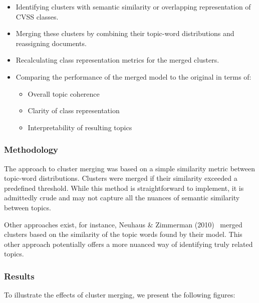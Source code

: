 \documentclass[12pt]{article}
\begin{document}
\begin{itemize}

	\item Identifying clusters with semantic similarity or overlapping representation of CVSS classes.

	\item Merging these clusters by combining their topic-word distributions and reassigning documents.

	\item Recalculating class representation metrics for the merged clusters.

	\item Comparing the performance of the merged model to the original in terms of:

	      \begin{itemize}

		      \item Overall topic coherence

		      \item Clarity of class representation

		      \item Interpretability of resulting topics

	      \end{itemize}

\end{itemize}

\subsubsection{Methodology}

The approach to cluster merging was based on a simple similarity metric between topic-word
distributions. Clusters were merged if their similarity exceeded a predefined threshold. While this
method is straightforward to implement, it is admittedly crude and may not capture all the nuances
of semantic similarity between topics.

Other approaches exist, for instance, Neuhaus \& Zimmerman
(2010)~\cite{cve_topic_modelling} merged clusters based on the similarity of the topic words found
by their model. This other approach potentially offers a more nuanced way of identifying truly related topics.

\subsubsection{Results}

To illustrate the effects of cluster merging, we present the following figures:
\end{document}

